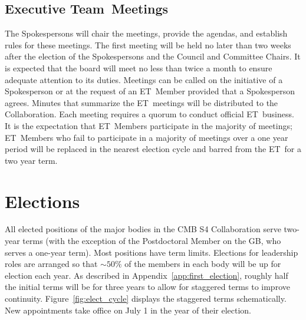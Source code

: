 \documentclass[12pt]{article}
\newcommand{\exec}{{Executive Team}}
\newcommand{\shorte}{{ET}}  %
\begin{document}


\subsection{\exec \ Meetings}

The Spokespersons will chair the meetings, provide the agendas, and establish rules for these meetings. The first meeting will be held no later than two weeks after the election of the Spokespersons and the Council and Committee Chairs. It is expected that the board will meet no less than twice a month to ensure adequate attention to its duties. Meetings can be called on the initiative of a Spokesperson or at the request of an \shorte\ Member provided that a Spokesperson agrees. Minutes that summarize the \shorte\ meetings will be distributed to the Collaboration. Each meeting requires a quorum to conduct official \shorte\ business.  It is the expectation that \shorte\ Members participate in the majority of meetings; \shorte\ Members who fail to participate %
in a majority of meetings over a one year period will be replaced in the nearest election cycle and barred from the \shorte\ for a two year term.  


\section{Elections}\label{sec:elections}
All elected positions of the major bodies in the CMB S4 Collaboration serve two-year terms (with the exception of the Postdoctoral Member on the GB, who serves a one-year term). Most positions have term limits.  Elections for leadership roles are  arranged so that $\sim 50\%$ of the members in each body will be up for election each year.  As described in Appendix~\ref{app:first_election}, roughly half the initial terms will be for three years to allow for staggered terms to improve continuity.  Figure~\ref{fig:elect_cycle} displays the staggered terms schematically.  New appointments take office on July 1 in the year of their election.  

\end{document}
